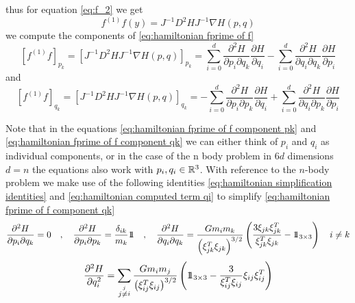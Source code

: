 \documentclass[12pt]{article}
\begin{document}
thus for equation \eqref{eq:f_2} we get
\begin{equation}\label{eq:hamiltonian fprime of f}
    f^{(1)}f(y) = J^{-1}D^2HJ^{-1}\nabla H(p,q)
\end{equation}
we compute the components of \eqref{eq:hamiltonian fprime of f}
\begin{equation}\label{eq:hamiltonian fprime of f component pk}
    \left[f^{(1)}f\right]_{p_k} = \left[ J^{-1}D^2HJ^{-1}\nabla H(p,q) \right]_{p_k} = \sum_{i=0}^d \frac{\partial^2 H}{\partial p_i\partial q_k}\frac{\partial H}{\partial q_i} 
    - \sum_{i=0}^d \frac{\partial^2 H}{\partial q_i \partial q_k}\frac{\partial H}{\partial p_i}
\end{equation}
and 
\begin{equation}\label{eq:hamiltonian fprime of f component qk}
    \left[f^{(1)}f\right]_{q_k} = \left[ J^{-1}D^2HJ^{-1}\nabla H(p,q) \right]_{q_k} = -\sum_{i=0}^d \frac{\partial^2 H}{\partial p_i\partial p_k} \frac{\partial H}{\partial q_i}
    + \sum_{i=0}^d \frac{\partial^2 H}{\partial q_i \partial p_k} \frac{\partial H}{\partial p_i}
\end{equation}

Note that in the equations \eqref{eq:hamiltonian fprime of f component pk} and \eqref{eq:hamiltonian fprime of f component qk} we can either think of $p_i$ and $q_i$ as individual components, or in the case of the n body problem in $6d$ dimensions $d=n$ the equations also work with $p_i,q_i\in \mathbb{R}^3$. With reference to the $n$-body problem we make use of the following identities \eqref{eq:hamiltonian simplification identities} and \eqref{eq:hamiltonian computed term qi} to simplify \eqref{eq:hamiltonian fprime of f component qk}
\begin{equation}\label{eq:hamiltonian simplification identities}
    \frac{\partial^2H}{\partial p_i\partial q_k} = 0\quad,\quad \frac{\partial^2 H}{\partial p_i\partial p_k} = \frac{\delta_{ik}}{m_k}1\!\!1 \quad,\quad 
    \frac{\partial^2 H}{\partial q_i\partial q_k} = \frac{Gm_im_k}{\left(\xi_{jk}^T\xi_{jk}\right)^{3/2}}\left( \frac{3 \xi_{jk}\xi_{jk}^T}{\xi_{jk}^T\xi_{jk}} - 1\!\!1_{3\times 3} \right) \quad i\neq k
\end{equation}
\begin{equation}\label{eq:hamiltonian computed term qi}
    \frac{\partial^2 H}{\partial q_i^2} =  \sum_{\stackrel{j}{j\neq i}} \frac{Gm_im_j}{\left(\xi_{ij}^T\xi_{ij}\right)^{3/2}}\left(
    1\!\!1_{3\times 3} - \frac{3}{\xi_{ij}^T\xi_{ij}} \xi_{ij}\xi_{ij}^T 
    \right)
\end{equation}
\end{document}
